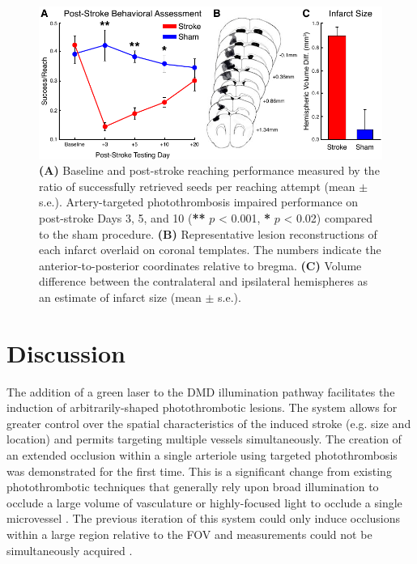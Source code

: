 \begin{figure}
    \includegraphics{figures/chapter_3/functionalimpairment.pdf}
    \caption{
        \label{fig:functionalimpairment}
        \textbf{(A)} Baseline and post-stroke reaching performance measured by the ratio of successfully retrieved seeds per reaching attempt (mean $\pm$ s.e.). Artery-targeted photothrombosis impaired performance on post-stroke Days 3, 5, and 10 (\textbf{**} $p$ \textless{} 0.001, \textbf{*} $p$ \textless{} 0.02) compared to the sham procedure. \textbf{(B)} Representative lesion reconstructions of each infarct overlaid on coronal templates. The numbers indicate the anterior-to-posterior coordinates relative to bregma. \textbf{(C)} Volume difference between the contralateral and ipsilateral hemispheres as an estimate of infarct size (mean $\pm$ s.e.).
    }
\end{figure}



\section{Discussion}

The addition of a green laser to the DMD illumination pathway facilitates the induction of arbitrarily-shaped photothrombotic lesions. The system allows for greater control over the spatial characteristics of the induced stroke (e.g. size and location) and permits targeting multiple vessels simultaneously. The creation of an extended occlusion within a single arteriole using targeted photothrombosis was demonstrated for the first time. This is a significant change from existing photothrombotic techniques that generally rely upon broad illumination to occlude a large volume of vasculature \cite{Watson:1985bp, Schrandt:2015gu} or highly-focused light to occlude a single microvessel \cite{Schaffer:2006fb}. The previous iteration of this system could only induce occlusions within a large region relative to the FOV and  measurements could not be simultaneously acquired \cite{Ponticorvo:2010uv}.

